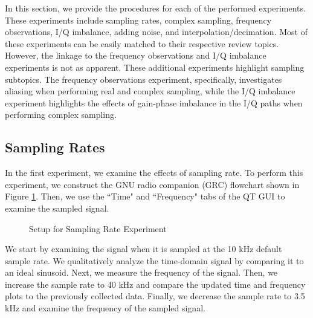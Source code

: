 \documentclass{article}
\begin{document}
In this section, we provide the procedures for each of the performed experiments. These experiments include sampling rates, complex sampling, frequency observations, I/Q imbalance, adding noise, and interpolation/decimation. Most of these experiments can be easily matched to their respective review topics. However, the linkage to the frequency observations and I/Q imbalance experiments is not as apparent. These additional experiments highlight sampling subtopics. The frequency observations experiment, specifically, investigates aliasing when performing real and complex sampling, while the I/Q imbalance experiment highlights the effects of gain-phase imbalance in the I/Q paths when performing complex sampling.

\subsection{Sampling Rates \label{subsection::sampling_rates}}

In the first experiment, we examine the effects of sampling rate. To perform this experiment, we construct the GNU radio companion (GRC) flowchart shown in Figure \ref{fig::sampling_rates_experiment}. Then, we use the ``Time" and ``Frequency" tabs of the QT GUI to examine the sampled signal.

\begin{figure}[H]
	\centerline{}
	\caption{Setup for Sampling Rate Experiment}
	\label{fig::sampling_rates_experiment}
\end{figure}

We start by examining the signal when it is sampled at the 10 kHz default sample rate. We qualitatively analyze the time-domain signal by comparing it to an ideal sinusoid. Next, we measure the frequency of the signal. Then, we increase the sample rate to 40 kHz and compare the updated time and frequency plots to the previously collected data. Finally, we decrease the sample rate to 3.5 kHz and examine the frequency of the sampled signal.
\end{document}
